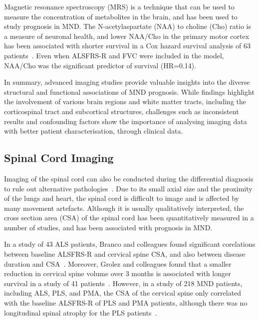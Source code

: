 Magnetic resonance spectroscopy (MRS) is a technique that can be used to measure the concentration of metabolites in the brain, and has been used to study prognosis in MND.
The N-acetylaspartate (NAA) to choline (Cho) ratio is a measure of neuronal health, and lower NAA/Cho in the primary motor cortex has been associated with shorter survival in a Cox hazard survival analysis of 63 patients~\cite{kalraCerebralDegenerationPredicts2006}.
Even when ALSFRS-R and FVC were included in the model, NAA/Cho was the significant predictor of survival (HR=0.14).

In summary, advanced imaging studies provide valuable insights into the diverse structural and functional associations of MND prognosis.
While findings highlight the involvement of various brain regions and white matter tracts, including the corticospinal tract and subcortical structures, challenges such as inconsistent results and confounding factors show the importance of analysing imaging data with better patient characterisation, through clinical data.

\subsection{Spinal Cord Imaging}

Imaging of the spinal cord can also be conducted during the differential diagnosis to rule out alternative pathologies~\cite{elmendiliSpinalCordImaging2019}.
Due to its small axial size and the proximity of the lungs and heart, the spinal cord is difficult to image and is affected by many movement artefacts.
Although it is usually qualitatively interpreted, the cross section area (CSA) of the spinal cord has been quantitatively measured in a number of studies, and has been associated with prognosis in MND.

In a study of 43 ALS patients, Branco and colleagues found significant corelations between baseline ALSFRS-R and cervical spine CSA, and also between disease duration and CSA~\cite{brancoSpinalCordAtrophy2014}.
Moreover, Grolez and colleagues found that a smaller reduction in cervical spine volume over 3 months is associated with longer survival in a study of 41 patients~\cite{grolezMRICervicalSpinal2018}.
However, in a study of 218 MND patients, including ALS, PLS, and PMA, the CSA of the cervical spine only correlated with the baseline ALSFRS-R of PLS and PMA patients, although there was no longitudinal spinal atrophy for the PLS patients~\cite{vanderburghCrosssectionalLongitudinalAssessment2019}.


